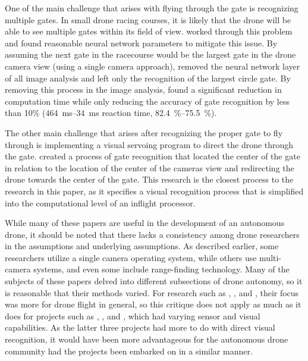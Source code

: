\documentclass[onecolumn,10pt]{IEEEtran}
\begin{document}
One of the main challenge that arises with flying through the gate is recognizing multiple gates. In small drone racing courses, it is likely that the drone will be able to see multiple gates within its field of view. \cite{jung2018perception} worked through this problem and found reasonable neural network parameters to mitigate this issue. By assuming the next gate in the racecourse would be the largest gate in the drone camera view (using a single camera approach), \cite{jung2018perception} removed the neural network layer of all image analysis and left only the recognition of the largest circle gate. By removing this process in the image analysis, \cite{jung2018perception} found a significant reduction in computation time while only reducing the accuracy of gate recognition by less than 10\% (\SIrange{464}{34}{\milli\second} reaction time, \SIrange{82.4}{75.5}{\percent}).
    
The other main challenge that arises after recognizing the proper gate to fly through is implementing a visual servoing program to direct the drone through the gate. \cite{jung2018direct} created a process of gate recognition that located the center of the gate in relation to the location of the center of the cameras view and redirecting the drone towards the center of the gate. This research is the closest process to the research in this paper, as it specifies a visual recognition process that is simplified into the computational level of an inflight processor.
    
While many of these papers are useful in the development of an autonomous drone, it should be noted that there lacks a consistency among drone researchers in the assumptions and underlying assumptions. As described earlier, some researchers utilize a single camera operating system, while others use multi-camera systems, and even some include range-finding technology. Many of the subjects of these papers delved into different subsections of drone autonomy, so it is reasonable that their methods varied. For research such as \cite{svacha2017improving}, \cite{loianno2017estimation}, and \cite{florence2018nanomap}, their focus was more for drone flight in general, so this critique does not apply as much as it does for projects such as \cite{zhilenkov2018use}, \cite{jung2018perception}, and \cite{jung2018direct}, which had varying sensor and visual capabilities. As the latter three projects had more to do with direct visual recognition, it would have been more advantageous for the autonomous drone community had the projects been embarked on in a similar manner.
    
\end{document}
